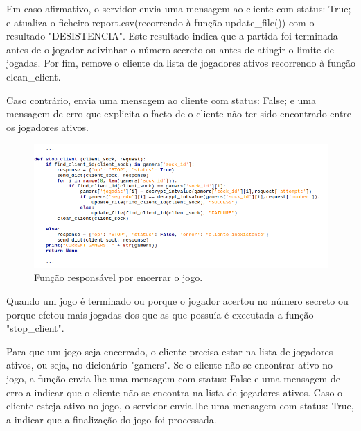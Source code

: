\documentclass{report}
\begin{document}
Em caso afirmativo, o servidor envia uma mensagem ao cliente com status: True; e atualiza o ficheiro report.csv(recorrendo à função update\_file()) com o resultado "DESISTENCIA". Este resultado indica que a partida foi terminada antes de o jogador adivinhar o número secreto ou antes de atingir o limite de jogadas. Por fim, remove o cliente da lista de jogadores ativos recorrendo à função clean\_client.

Caso contrário, envia uma mensagem ao cliente com status: False; e uma mensagem de erro que explicita o facto de o cliente não ter sido encontrado entre os jogadores ativos.

\begin{figure}[H]
        \centering
        \includegraphics[scale=0.65]{stop_client}       
        \caption{Função responsável por encerrar o jogo.}
\end{figure}
Quando um jogo é terminado ou porque o jogador acertou no número secreto ou porque efetou mais jogadas dos que as que possuía é executada a função "stop\_client".

Para que um jogo seja encerrado, o cliente precisa estar na lista de jogadores ativos, ou seja, no dicionário "gamers".
Se o cliente não se encontrar ativo no jogo, a função envia-lhe uma mensagem com status: False e uma mensagem de erro a indicar que o cliente não se encontra na lista de jogadores ativos.
Caso o cliente esteja ativo no jogo, o servidor envia-lhe uma mensagem com status: True, a indicar que a finalização do jogo foi processada.
\end{document}
